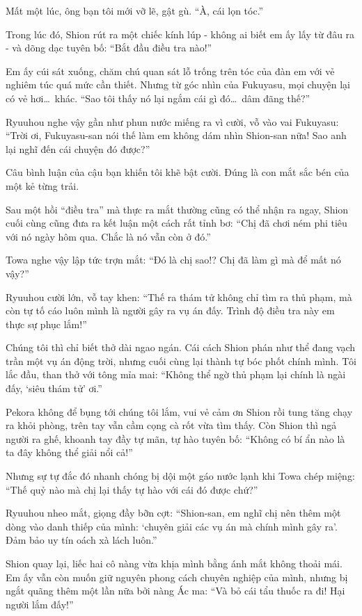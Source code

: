 \documentclass[../main.tex]{subfiles}
\begin{document}
Mất một lúc, ông bạn tôi mới vỡ lẽ, gật gù. ``À, cái lọn tóc.''

Trong lúc đó, Shion rút ra một chiếc kính lúp - không ai biết em ấy lấy từ đâu ra - và dõng dạc tuyên bố: ``Bắt đầu điều tra nào!''

Em ấy cúi sát xuống, chăm chú quan sát lỗ trống trên tóc của đàn em với vẻ nghiêm túc quá mức cần thiết. Nhưng từ góc nhìn của Fukuyasu, mọi chuyện lại có vẻ hơi\dots\ khác. ``Sao tôi thấy nó lại ngắm cái gì đó\dots\ dâm đãng thế?''

Ryuuhou nghe vậy gần như phun nước miếng ra vì cười, vỗ vào vai Fukuyasu: ``Trời ơi, Fukuyasu-san nói thế làm em không dám nhìn Shion-san nữa! Sao anh lại nghĩ đến cái chuyện đó được?''

Câu bình luận của cậu bạn khiến tôi khẽ bật cười. Đúng là con mắt sắc bén của một kẻ từng trải.

Sau một hồi ``điều tra'' mà thực ra mắt thường cũng có thể nhận ra ngay, Shion cuối cùng cũng đưa ra kết luận một cách rất tỉnh bơ: ``Chị đã chơi ném phi tiêu với nó ngày hôm qua. Chắc là nó vẫn còn ở đó.''


Towa nghe vậy lập tức trợn mắt: ``Đó là chị sao!? Chị đã làm gì mà để mất nó vậy?''

Ryuuhou cười lớn, vỗ tay khen: ``Thế ra thám tử không chỉ tìm ra thủ phạm, mà còn tự tố cáo luôn mình là người gây ra vụ án đấy. Trình độ điều tra này em thực sự phục lắm!''

Chúng tôi thì chỉ biết thở dài ngao ngán. Cái cách Shion phán như thể đang vạch trần một vụ án động trời, nhưng cuối cùng lại thành tự bóc phốt chính mình. Tôi lắc đầu, than thở với tông mỉa mai: ``Không thể ngờ thủ phạm lại chính là ngài đấy, `siêu thám tử' ơi.''

Pekora không để bụng tới chúng tôi lắm, vui vẻ cảm ơn Shion rồi tung tăng chạy ra khỏi phòng, trên tay vẫn cầm cọng cà rốt vừa tìm thấy. Còn Shion thì ngả người ra ghế, khoanh tay đầy tự mãn, tự hào tuyên bố: ``Không có bí ẩn nào là ta đây không thể giải nổi cả!''

Nhưng sự tự đắc đó nhanh chóng bị dội một gáo nước lạnh khi Towa chép miệng: ``Thế quỷ nào mà chị lại thấy tự hào với cái đó được chứ?''

Ryuuhou nheo mắt, giọng đầy bỡn cợt: ``Shion-san, em nghĩ chị nên thêm một dòng vào danh thiếp của mình: `chuyên giải các vụ án mà chính mình gây ra'. Đảm bảo uy tín oách xà lách luôn.''

Shion quay lại, liếc hai cô nàng vừa khịa mình bằng ánh mắt không thoải mái. Em ấy vẫn còn muốn giữ nguyên phong cách chuyên nghiệp của mình, nhưng bị ngắt quãng thêm một lần nữa bởi nàng Ác ma: ``Và bỏ cái tẩu thuốc ra đi! Hại người lắm đấy!''
\end{document}
